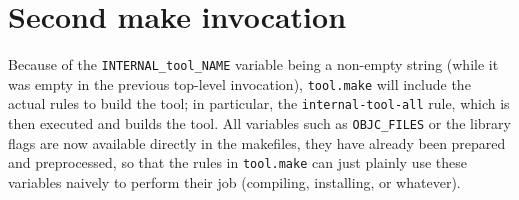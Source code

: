 \documentclass[a4paper]{article}
\begin{document}
\section{Second make invocation}
Because of the \texttt{INTERNAL\_tool\_NAME} variable being a
non-empty string (while it was empty in the previous top-level
invocation), \texttt{tool.make} will include the actual rules to build
the tool; in particular, the \texttt{internal-tool-all} rule, which is
then executed and builds the tool.  All variables such as
\texttt{OBJC\_FILES} or the library flags are now available directly
in the makefiles, they have already been prepared and preprocessed, so
that the rules in \texttt{tool.make} can just plainly use these
variables naively to perform their job (compiling, installing, or
whatever).
\end{document}
